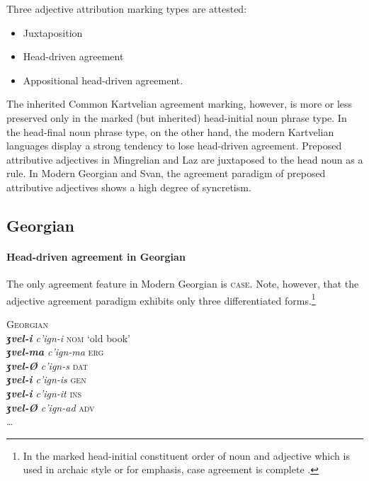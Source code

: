 Three adjective attribution marking types are attested:
\begin{itemize}
\item Juxtaposition
\item Head-driven agreement
\item Appositional head-driven agreement.
\end{itemize}
The inherited Common Kartvelian agreement marking, however, is more or less preserved only in the marked (but inherited) head-initial noun phrase type. In the head-final noun phrase type, on the other hand, the modern Kartvelian languages display a strong tendency to lose head-driven agreement. Preposed attributive adjectives in Mingrelian and Laz are juxtaposed to the head noun as a rule. In Modern Georgian and Svan, the agreement paradigm of preposed attributive adjectives shows a high degree of syncretism.

\subsection{Georgian}\label{georgian synchr}
\paragraph{Head-driven agreement in Georgian}
The only agreement feature in Modern Georgian is \textsc{case}. Note, however, that the adjective agreement paradigm exhibits only three differentiated forms.\footnote{In the marked head-initial constituent order of noun and adjective which is used in archaic style or for emphasis, case agreement is complete \citep[59]{tuite1998}.}
\begin{exe}
\ex \textsc{Georgian} \cite[236]{aronson1991}\\
\textit{\textbf{ʒvel-i} c'ign-i} \textsc{nom} ‘old book’\\
\textit{\textbf{ʒvel-ma} c'ign-ma} \textsc{erg}\\
\textit{\textbf{ʒvel-Ø} c'ign-s} \textsc{dat}\\
\textit{\textbf{ʒvel-i} c'ign-is} \textsc{gen}\\
\textit{\textbf{ʒvel-i} c'ign-it} \textsc{ins}\\
\textit{\textbf{ʒvel-Ø} c'ign-ad} \textsc{adv}\\
\dots \label{georgian old}
\end{exe}

